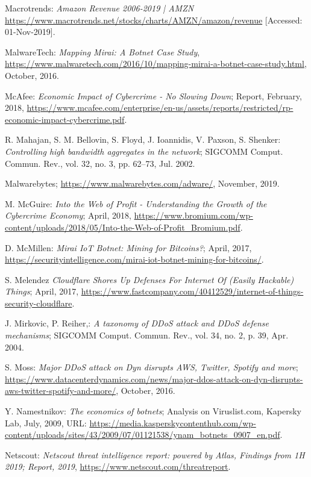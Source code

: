 \begin{thebibliography}{99}
 Macrotrends: \emph{Amazon Revenue 2006-2019 | AMZN} \url{https://www.macrotrends.net/stocks/charts/AMZN/amazon/revenue} [Accessed: 01-Nov-2019].

 MalwareTech: \emph{Mapping Mirai: A Botnet Case Study}, \url{https://www.malwaretech.com/2016/10/mapping-mirai-a-botnet-case-study.html}, October, 2016.

 McAfee: \emph{Economic Impact of Cybercrime - No Slowing Down}; Report, February, 2018, \url{https://www.mcafee.com/enterprise/en-us/assets/reports/restricted/rp-economic-impact-cybercrime.pdf}.

 R. Mahajan, S. M. Bellovin, S. Floyd, J. Ioannidis, V. Paxson, S. Shenker: \emph{Controlling high bandwidth aggregates in the network}; SIGCOMM Comput. Commun. Rev., vol. 32, no. 3, pp. 62--73, Jul. 2002.

 Malwarebytes; \url{https://www.malwarebytes.com/adware/}, November, 2019.

 M. McGuire: \emph{Into the Web of Profit - Understanding the Growth of the Cybercrime Economy}; April, 2018, \url{https://www.bromium.com/wp-content/uploads/2018/05/Into-the-Web-of-Profit_Bromium.pdf}.

 D. McMillen: \emph{Mirai IoT Botnet: Mining for Bitcoins?}; April, 2017, \url{https://securityintelligence.com/mirai-iot-botnet-mining-for-bitcoins/}.

 S. Melendez \emph{Cloudflare Shores Up Defenses For Internet Of (Easily Hackable) Things}; April, 2017, \url{https://www.fastcompany.com/40412529/internet-of-things-security-cloudflare}.

 J. Mirkovic, P. Reiher,: \emph{A taxonomy of DDoS attack and DDoS defense mechanisms}; SIGCOMM Comput. Commun. Rev., vol. 34, no. 2, p. 39, Apr. 2004.

 S. Moss: \emph{Major DDoS attack on Dyn disrupts AWS, Twitter, Spotify and more}; \url{https://www.datacenterdynamics.com/news/major-ddos-attack-on-dyn-disrupts-aws-twitter-spotify-and-more/}, October, 2016.

 Y. Namestnikov: \emph{The economics of botnets}; Analysis on Viruslist.com, Kapersky Lab, July, 2009, URL: \url{https://media.kasperskycontenthub.com/wp-content/uploads/sites/43/2009/07/01121538/ynam_botnets_0907_en.pdf}.

 Netscout: \emph{Netscout threat intelligence report: powered by Atlas, Findings from 1H 2019; Report, 2019}, \url{https://www.netscout.com/threatreport}.


\end{thebibliography}
